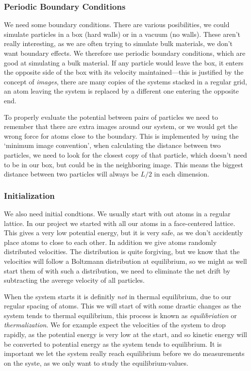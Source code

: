 \documentclass[a4paper, 11pt, notitlepage, english]{article}
\begin{document}
\subsubsection*{Periodic Boundary Conditions}

We need some boundary conditions. There are various posibilities, we could simulate particles in a box (hard walls) or in a vacuum (no walls). These aren't really interesting, as we are often trying to simulate bulk materials, we don't want boundary effects. We therefore use periodic boundary conditions, which are good at simulating a bulk material. If any particle would leave the box, it enters the opposite side of the box with its velocity maintained---this is justified by the concept of \emph{images}, there are many copies of the systems stacked in a regular grid, an atom leaving the system is replaced by a different one entering the opposite end.

To properly evaluate the potential between pairs of particles we need to remember that there are extra images around our system, or we would get the wrong force for atoms close to the boundary. This is implemented by using the `minimum image convention', when calculating the distance between two particles, we need to look for the closest copy of that particle, which doesn't need to be in our box, but could be in the neighboring image. This means the biggest distance between two particles will always be $L/2$ in each dimension.

\subsubsection*{Initialization}

We also need initial condtions. We usually start with out atoms in a regular lattice. In our project we started with all our atoms in a face-centered lattice. This gives a very low potential energy, but it is very safe, as we don't accidently place atoms to close to each other. In addition we give atoms randomly distributed velocities. The distribution is quite forgiving, but we know that the velocities will follow a Boltzmann distribution at equilibrium, so we might as well start them of with such a distribution, we need to eliminate the net drift by subtracting the averege velocity of all particles.

When the system starts it is definitly \emph{not} in thermal equilibrium, due to our regular spacing of atoms. This we will start of with some drastic changes as the system tends to thermal equilibrium, this process is known as \emph{equilibriation} or \emph{thermalization}. We for example expect the velocities of the system to drop rapidly, as the potential energy is very low at the start, and so kinetic energy will be converted to potential energy as the system tends to equilibrium. It is important we let the system really reach equilibrium before we do measurements on the syste, as we only want to study the equilibrium-values.
\end{document}
